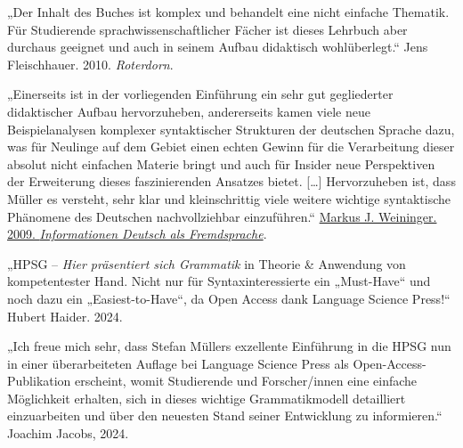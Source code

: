 {\noindent
„Der Inhalt des Buches ist komplex und behandelt eine nicht einfache Thematik. Für Studierende
sprachwissenschaftlicher Fächer ist dieses Lehrbuch aber durchaus geeignet und auch in seinem Aufbau
didaktisch wohlüberlegt.“ Jens Fleischhauer. 2010. \emph{Roterdorn}. 

\medskip

\noindent
„Einerseits ist in der vorliegenden Einführung ein sehr gut gegliederter didaktischer Aufbau
hervorzuheben, andererseits kamen viele neue Beispielanalysen komplexer syntaktischer
Strukturen der deutschen Sprache dazu, was für Neulinge auf dem Gebiet einen echten Gewinn für die
Verarbeitung dieser absolut nicht einfachen Materie bringt und auch für Insider neue Perspektiven
der Erweiterung dieses faszinierenden Ansatzes bietet. [\ldots] Hervorzuheben ist, dass Müller es
versteht, sehr klar und kleinschrittig viele weitere wichtige syntaktische Phänomene des Deutschen
nachvollziehbar einzuführen.“ \href{https://doi.org/10.1515/infodaf-2009-2-361}{Markus J. Weininger. 2009. \emph{Informationen Deutsch als Fremdsprache}}. 


\medskip

\noindent

\noindent
„HPSG – \emph{Hier präsentiert sich Grammatik} in Theorie \& Anwendung von kompetentester
Hand. Nicht nur für Syntaxinteressierte ein „Must-Have“ und noch dazu ein „Easiest-to-Have“, da Open
Access dank Language Science Press!“ Hubert Haider. 2024.

\medskip

\noindent
„Ich freue mich sehr, dass Stefan Müllers exzellente Einführung  in die HPSG nun in einer
überarbeiteten Auflage bei Language Science Press als Open-Access-Publikation erscheint, womit
Studierende und Forscher/innen eine einfache Möglichkeit erhalten, sich in dieses wichtige
Grammatikmodell detailliert einzuarbeiten und über den neuesten Stand seiner Entwicklung zu
informieren.“ Joachim Jacobs, 2024.

}



\dedication{Ich widme dieses Buch Brigitte Narr als Dank für ihren unermüdlichen Einsatz für die
  Sprachwissenschaft.\\Sie gehört definitiv zu den Guten im Verlagswesen.}

